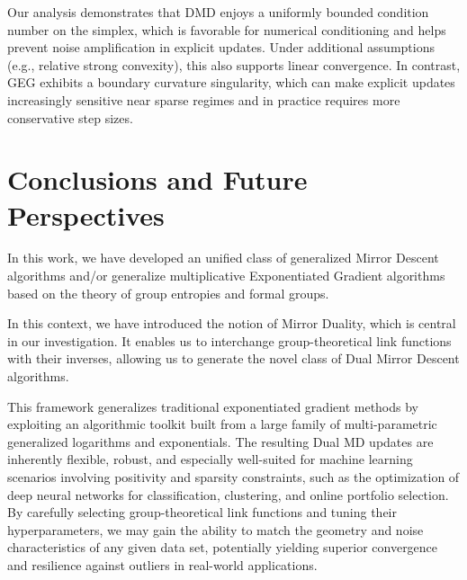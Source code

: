 \documentclass[10pt]{amsart}
\newcommand{\tcb}{\textcolor{blue}}
\theoremstyle{definition}
\theoremstyle{definition}	 %
\begin{document}
Our analysis demonstrates that DMD enjoys a uniformly bounded condition number on the simplex, which is favorable for numerical conditioning and helps prevent noise amplification in explicit updates. Under additional assumptions (e.g., relative strong convexity), this also supports linear convergence. In contrast, GEG exhibits a boundary curvature singularity, which can make explicit updates increasingly sensitive near sparse regimes and in practice requires more conservative step sizes.




\section{Conclusions and Future Perspectives } \label{Sec7}

In this work, we have developed an unified class of generalized  Mirror Descent algorithms and/or generalize multiplicative Exponentiated Gradient algorithms based on the theory of group entropies and formal groups.


In this context, we have introduced the notion of Mirror Duality, which is central in our investigation. It enables us to interchange group-theoretical link functions with their inverses, allowing us to generate the novel class of Dual Mirror Descent algorithms.

This framework generalizes traditional exponentiated gradient methods by exploiting an algorithmic toolkit built from a large family of multi-parametric generalized logarithms and exponentials. The resulting Dual MD updates are inherently flexible, robust, and especially well-suited for machine learning scenarios involving positivity and sparsity constraints, such as the optimization of deep neural networks for classification, clustering, and online portfolio selection. By carefully selecting group-theoretical link functions and tuning their hyperparameters, we  may gain the ability to match the geometry and noise characteristics of any given data set, potentially yielding superior convergence and resilience against outliers in real-world applications.

\end{document}
